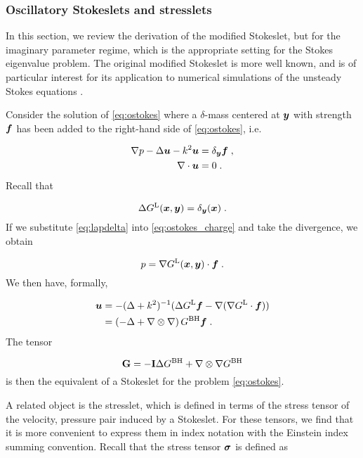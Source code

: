 \subsubsection{Oscillatory Stokeslets and stresslets}


In this section, we review the derivation of the
modified Stokeslet, but for the imaginary parameter
regime, which is the appropriate setting for the Stokes
eigenvalue problem.
The original modified Stokeslet is more well known,
and is of particular interest for its application to
numerical simulations of the unsteady Stokes equations
\cite{pozrikidis1992boundary,biros2002embedded}.

 Consider the solution of
\cref{eq:ostokes} where a $\delta$-mass
centered at ${\boldsymbol y}$ with strength ${\boldsymbol f}$
has been added to the right-hand side of \cref{eq:ostokes}, i.e.

\begin{align}
  \nabla p - \Delta {\boldsymbol u} - k^2 {\boldsymbol u} &= \delta_{\boldsymbol y} {\boldsymbol f} \; ,
  \label{eq:ostokes_charge}  \\
  \nabla \cdot {\boldsymbol u} &= 0 \; . \nonumber
\end{align}
Recall that

\begin{equation}
 \Delta G^{\textrm{L}}({\boldsymbol x},{\boldsymbol y}) = \delta_{\boldsymbol y}({\boldsymbol x}) \; . \label{eq:lapdelta}
\end{equation}
If we substitute \eqref{eq:lapdelta} into
\eqref{eq:ostokes_charge} and take the divergence,
we obtain

\begin{equation}
  p = \nabla G^{\textrm{L}}({\boldsymbol x},{\boldsymbol y}) \cdot {\boldsymbol f} \; . \nonumber
\end{equation}
We then have, formally,

\begin{align}
  {\boldsymbol u} &= - (\Delta + k^2)^{-1} ( \Delta G^{\textrm{L}} {\boldsymbol f}
  - \nabla (\nabla G^{\textrm{L}} \cdot {\boldsymbol f} ) ) \nonumber \\
  &= \left ( -\Delta + \nabla \otimes \nabla \right )
  G^{\textrm{BH}} {\boldsymbol f} \; . \nonumber
\end{align}
The tensor

\begin{equation} \label{eq:ostokeslet}
  {\bf G} = - {\bf I} \Delta G^{\textrm{BH}} + \nabla \otimes \nabla G^{\textrm{BH}}
\end{equation}
is then the equivalent of a Stokeslet
\cite{pozrikidis1992boundary} for the problem
\eqref{eq:ostokes}.

A related object is the stresslet, which is defined
in terms of the stress tensor of the velocity, pressure
pair induced by a Stokeslet. For these tensors, we find
that it is more convenient to express them in index notation
with the Einstein index summing convention.
Recall that the stress tensor ${\boldsymbol \sigma}$ is defined as 

